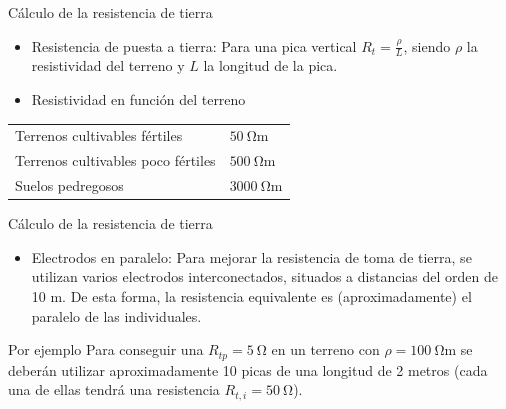 \documentclass[aspectratio=169, usenames,svgnames,dvipsnames]{beamer}
\begin{document}
\begin{frame}[label={sec:org0b5170c}]{Cálculo de la resistencia de tierra}
\begin{itemize}
\item \alert{Resistencia de puesta a tierra}: Para una pica vertical
\(R_{t}=\frac{\rho}{L}\), siendo \(\rho\) la resistividad del terreno y
\(L\) la longitud de la pica.

\item \alert{Resistividad en función del terreno}
\end{itemize}

\begin{center}
\begin{tabular}{ll}
Terrenos cultivables fértiles & \(\SI{50}{\ohm\meter}\)\\[0pt]
Terrenos cultivables poco fértiles & \(\SI{500}{\ohm\meter}\)\\[0pt]
Suelos pedregosos & \(\SI{3000}{\ohm\meter}\)\\[0pt]
\end{tabular}
\end{center}
\end{frame}

\begin{frame}[label={sec:orgefa47a0}]{Cálculo de la resistencia de tierra}
\begin{itemize}
\item \alert{Electrodos en paralelo}: Para mejorar la resistencia de toma de
tierra, se utilizan varios electrodos interconectados, situados a
distancias del orden de 10 m. De esta forma, \alert{la resistencia
equivalente es (aproximadamente) el paralelo de las individuales}.
\end{itemize}

\begin{block}{Por ejemplo}
Para conseguir una \(R_{tp}=\SI{5}{\ohm}\) en un terreno con
\(\rho=\SI{100}{\ohm\meter}\) se deberán utilizar aproximadamente 10
picas de una longitud de 2 metros (cada una de ellas tendrá una
resistencia \(R_{t,i}=\SI{50}{\ohm}\)).
\end{block}
\end{frame}
\end{document}
